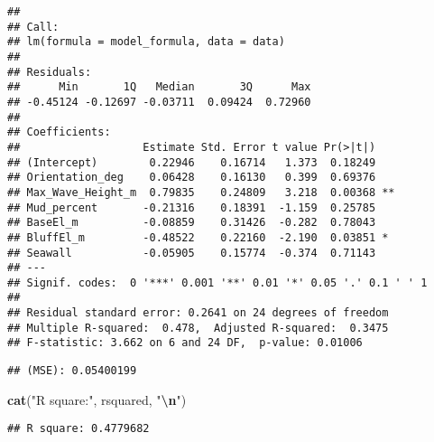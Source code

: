 \documentclass[
]{article}
\newenvironment{Shaded}{\begin{snugshade}}{\end{snugshade}}
\newcommand{\DecValTok}[1]{\textcolor[rgb]{0.00,0.00,0.81}{#1}}
\newcommand{\FunctionTok}[1]{\textcolor[rgb]{0.13,0.29,0.53}{\textbf{#1}}}
\newcommand{\NormalTok}[1]{#1}
\newcommand{\OtherTok}[1]{\textcolor[rgb]{0.56,0.35,0.01}{#1}}
\newcommand{\SpecialCharTok}[1]{\textcolor[rgb]{0.81,0.36,0.00}{\textbf{#1}}}
\newcommand{\StringTok}[1]{\textcolor[rgb]{0.31,0.60,0.02}{#1}}
\begin{document}
\begin{verbatim}
## 
## Call:
## lm(formula = model_formula, data = data)
## 
## Residuals:
##      Min       1Q   Median       3Q      Max 
## -0.45124 -0.12697 -0.03711  0.09424  0.72960 
## 
## Coefficients:
##                   Estimate Std. Error t value Pr(>|t|)   
## (Intercept)        0.22946    0.16714   1.373  0.18249   
## Orientation_deg    0.06428    0.16130   0.399  0.69376   
## Max_Wave_Height_m  0.79835    0.24809   3.218  0.00368 **
## Mud_percent       -0.21316    0.18391  -1.159  0.25785   
## BaseEl_m          -0.08859    0.31426  -0.282  0.78043   
## BluffEl_m         -0.48522    0.22160  -2.190  0.03851 * 
## Seawall           -0.05905    0.15774  -0.374  0.71143   
## ---
## Signif. codes:  0 '***' 0.001 '**' 0.01 '*' 0.05 '.' 0.1 ' ' 1
## 
## Residual standard error: 0.2641 on 24 degrees of freedom
## Multiple R-squared:  0.478,  Adjusted R-squared:  0.3475 
## F-statistic: 3.662 on 6 and 24 DF,  p-value: 0.01006
\end{verbatim}

\begin{Shaded}
\end{Shaded}

\begin{verbatim}
## (MSE): 0.05400199
\end{verbatim}

\begin{Shaded}
\begin{Highlighting}[]
\FunctionTok{cat}\NormalTok{(}\StringTok{"R square:"}\NormalTok{, rsquared, }\StringTok{"}\SpecialCharTok{\textbackslash{}n}\StringTok{"}\NormalTok{)}
\end{Highlighting}
\end{Shaded}

\begin{verbatim}
## R square: 0.4779682
\end{verbatim}
\end{document}
